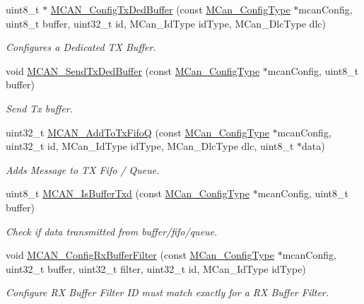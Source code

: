 \begin{DoxyCompactItemize}
uint8\+\_\+t $\ast$ \mbox{\hyperlink{group__can__module_ga7188d34f789a5ba22b48cb650320c12e}{M\+C\+A\+N\+\_\+\+Config\+Tx\+Ded\+Buffer}} (const \mbox{\hyperlink{structMCan__ConfigTag}{M\+Can\+\_\+\+Config\+Type}} $\ast$mcan\+Config, uint8\+\_\+t buffer, uint32\+\_\+t id, M\+Can\+\_\+\+Id\+Type id\+Type, M\+Can\+\_\+\+Dlc\+Type dlc)
\begin{DoxyCompactList}\small\item\em Configures a Dedicated TX Buffer. \end{DoxyCompactList}\item 
void \mbox{\hyperlink{group__can__module_gab682df72e52163a4bbd6f89fe25a2459}{M\+C\+A\+N\+\_\+\+Send\+Tx\+Ded\+Buffer}} (const \mbox{\hyperlink{structMCan__ConfigTag}{M\+Can\+\_\+\+Config\+Type}} $\ast$mcan\+Config, uint8\+\_\+t buffer)
\begin{DoxyCompactList}\small\item\em Send Tx buffer. \end{DoxyCompactList}\item 
uint32\+\_\+t \mbox{\hyperlink{group__can__module_gace77a1a2cb9ad1ae872ce9d6a163f732}{M\+C\+A\+N\+\_\+\+Add\+To\+Tx\+FifoQ}} (const \mbox{\hyperlink{structMCan__ConfigTag}{M\+Can\+\_\+\+Config\+Type}} $\ast$mcan\+Config, uint32\+\_\+t id, M\+Can\+\_\+\+Id\+Type id\+Type, M\+Can\+\_\+\+Dlc\+Type dlc, uint8\+\_\+t $\ast$data)
\begin{DoxyCompactList}\small\item\em Adds Message to TX Fifo / Queue. \end{DoxyCompactList}\item 
uint8\+\_\+t \mbox{\hyperlink{group__can__module_gaee6e3a1e95ef603e33da5421167ad776}{M\+C\+A\+N\+\_\+\+Is\+Buffer\+Txd}} (const \mbox{\hyperlink{structMCan__ConfigTag}{M\+Can\+\_\+\+Config\+Type}} $\ast$mcan\+Config, uint8\+\_\+t buffer)
\begin{DoxyCompactList}\small\item\em Check if data transmitted from buffer/fifo/queue. \end{DoxyCompactList}\item 
void \mbox{\hyperlink{group__can__module_ga6e83faedb469981e30a552ab125ad181}{M\+C\+A\+N\+\_\+\+Config\+Rx\+Buffer\+Filter}} (const \mbox{\hyperlink{structMCan__ConfigTag}{M\+Can\+\_\+\+Config\+Type}} $\ast$mcan\+Config, uint32\+\_\+t buffer, uint32\+\_\+t filter, uint32\+\_\+t id, M\+Can\+\_\+\+Id\+Type id\+Type)
\begin{DoxyCompactList}\small\item\em Configure RX Buffer Filter ID must match exactly for a RX Buffer Filter. \end{DoxyCompactList}\item 

\end{DoxyCompactItemize}
